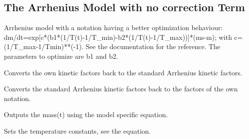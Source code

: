 \documentclass[letterpaper,10pt,english]{sphinxmanual}
\begin{document}
\subsection{The Arrhenius Model with no correction Term}
\label{FittingClasses:the-arrhenius-model-with-no-correction-term}

\begin{fulllineitems}
\label{FittingClasses:Models.ArrheniusModelAlternativeNotation2}
Arrhenius model with a notation having a better optimization behaviour: dm/dt=exp{[}c*(b1*(1/T(t)-1/T\_min)-b2*(1/T(t)-1/T\_max)){]}*(ms-m); with c=(1/T\_max-1/Tmin)**(-1). See the documentation for the reference. The parameters to optimize are b1 and b2.

\begin{fulllineitems}
\label{FittingClasses:Models.ArrheniusModelAlternativeNotation2.ConvertKinFactors}
Converts the own kinetic factors back to the standard Arrhenius kinetic factors.

\end{fulllineitems}


\begin{fulllineitems}
\label{FittingClasses:Models.ArrheniusModelAlternativeNotation2.ConvertKinFactorsToOwnNotation}
Converts the standard Arrhenius kinetic factors back to the factors of the own notation.

\end{fulllineitems}


\begin{fulllineitems}
\label{FittingClasses:Models.ArrheniusModelAlternativeNotation2.calcMass}
Outputs the mass(t) using the model specific equation.

\end{fulllineitems}


\begin{fulllineitems}
\label{FittingClasses:Models.ArrheniusModelAlternativeNotation2.setMinMaxTemp}
Sets the temperature constants, see the equation.

\end{fulllineitems}


\end{fulllineitems}
\end{document}
